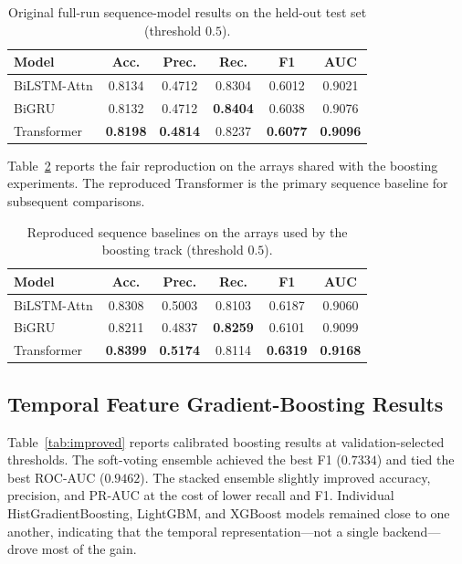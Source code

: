 \documentclass[conference]{IEEEtran}
\begin{document}
\begin{table}[t]
\caption{Original full-run sequence-model results on the held-out test set (threshold $0.5$).}
\label{tab:baseline-original}
\centering
\scriptsize
\setlength{\tabcolsep}{3.5pt}
\begin{tabular}{lccccc}
\toprule
Model & Acc. & Prec. & Rec. & F1 & AUC\\
\midrule
BiLSTM-Attn & 0.8134 & 0.4712 & 0.8304 & 0.6012 & 0.9021\\
BiGRU & 0.8132 & 0.4712 & \textbf{0.8404} & 0.6038 & 0.9076\\
Transformer & \textbf{0.8198} & \textbf{0.4814} & 0.8237 & \textbf{0.6077} & \textbf{0.9096}\\
\bottomrule
\end{tabular}
\end{table}

Table~\ref{tab:baseline-repro} reports the fair reproduction on the arrays shared with the boosting experiments. The reproduced Transformer is the primary sequence baseline for subsequent comparisons.

\begin{table}[t]
\caption{Reproduced sequence baselines on the arrays used by the boosting track (threshold $0.5$).}
\label{tab:baseline-repro}
\centering
\scriptsize
\setlength{\tabcolsep}{3.5pt}
\begin{tabular}{lccccc}
\toprule
Model & Acc. & Prec. & Rec. & F1 & AUC\\
\midrule
BiLSTM-Attn & 0.8308 & 0.5003 & 0.8103 & 0.6187 & 0.9060\\
BiGRU & 0.8211 & 0.4837 & \textbf{0.8259} & 0.6101 & 0.9099\\
Transformer & \textbf{0.8399} & \textbf{0.5174} & 0.8114 & \textbf{0.6319} & \textbf{0.9168}\\
\bottomrule
\end{tabular}
\end{table}

\subsection{Temporal Feature Gradient-Boosting Results}
Table~\ref{tab:improved} reports calibrated boosting results at validation-selected thresholds. The soft-voting ensemble achieved the best F1 ($0.7334$) and tied the best ROC-AUC ($0.9462$). The stacked ensemble slightly improved accuracy, precision, and PR-AUC at the cost of lower recall and F1. Individual HistGradientBoosting, LightGBM, and XGBoost models remained close to one another, indicating that the temporal representation---not a single backend---drove most of the gain.
\end{document}
